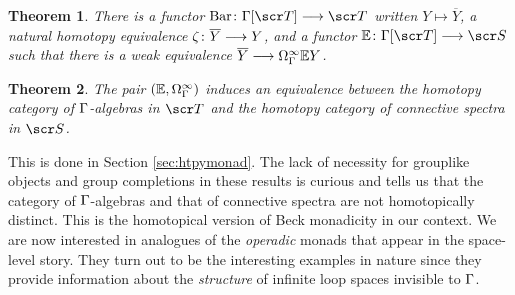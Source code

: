 \documentclass{amsart}
\newtheorem{thm}{Theorem}[section]
\theoremstyle{definition}
\begin{document}
\begin{thm}\label{thm:0.1}
There is a functor $\mathrm{Bar} \colon \GA [\sT] \rtarr \sT$ written $Y \mapsto \overline{Y}$, a natural homotopy equivalence $\zeta \colon \overline{Y} \longrightarrow Y$, and a functor $\bE \colon \GA[\sT] \rtarr \sS$ such that there is a weak equivalence $\overline{Y} \longrightarrow \Omega^{\infty}_{\Gamma} \mathbb{E} Y$.
\end{thm}

\begin{thm}\label{thm:0.2}
The pair $(\mathbb{E},\Omega^{\infty}_{\Gamma})$ induces an equivalence between the homotopy category of $\Gamma$-algebras in $\sT$ and the homotopy category of connective spectra in $\sS$.
\end{thm}

\noindent This is done in Section \ref{sec:htpymonad}. The lack of necessity for grouplike objects and group completions in these results is curious and tells us that the category of $\Gamma$-algebras and that of connective spectra are not homotopically distinct. This is the homotopical version of Beck monadicity in our context. We are now interested in analogues of the \emph{operadic} monads that appear in the space-level story. They turn out to be the interesting examples in nature since they provide information about the \emph{structure} of infinite loop spaces invisible to $\Gamma$.\\
\end{document}
